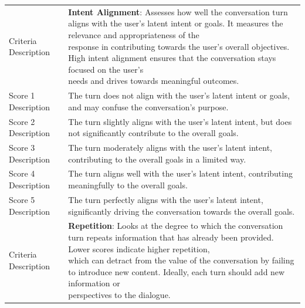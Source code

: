\begin{tabular}{ll} 
\toprule
Criteria Description & \textbf{Intent Alignment}: \makecell[l]{Assesses how well the conversation turn aligns with the user's latent intent or goals. It measures the relevance and appropriateness of the \\ response in contributing towards the user's overall objectives. High intent alignment ensures that the conversation stays focused on the user's\\ needs and drives towards meaningful outcomes. }                                                                                                      \\
Score 1 Description  & The turn does not align with the user's latent intent or goals, and may confuse the conversation's purpose.                                                                                                                    \\
Score 2 Description  & The turn slightly aligns with the user's latent intent, but does not significantly contribute to the overall goals.                                                                                       \\
Score 3 Description  & The turn moderately aligns with the user's latent intent, contributing to the overall goals in a limited way.                                                                                \\
Score 4 Description  & The turn aligns well with the user's latent intent, contributing meaningfully to the overall goals.                                                                                                              \\
Score 5 Description  & The turn perfectly aligns with the user's latent intent, significantly driving the conversation towards the overall goals.                                                                             \\ 
\midrule
Criteria Description & \textbf{Repetition}: \makecell[l]{Looks at the degree to which the conversation turn repeats information that has already been provided. Lower scores indicate higher repetition, \\ which can detract from the value of the conversation by failing to introduce new content. Ideally, each turn should add new information or \\ perspectives to the dialogue.}                                                                 \\

\end{tabular}

